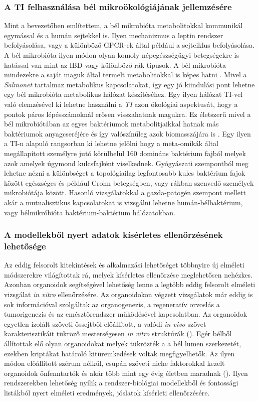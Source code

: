 \documentclass[a4paper,12pt]{article}
\begin{document}
		\subsubsection{A TI felhasználása bél mikroökológiájának jellemzésére}
		Mint a bevezetőben említettem, a bél mikrobióta metabolitokkal kommunikál egymással és a humán sejtekkel is. Ilyen mechanizmus a leptin rendszer befolyásolása, vagy a különböző GPCR-ek által például a sejtciklus befolyásolása\cite{buthyrate_immune}.  A bél mikrobióta ilyen módon olyan komoly népegészségügyi betegségekre is hatással van mint az IBD vagy különböző rák típusok\cite{gut_microbiome}.  A bél mikrobióta mindezekre a saját maguk által termelt metabolitokkal is képes hatni \cite{scfa_and_vitamine}. Mivel a \textit{Salmonet} tartalmaz metabolikus kapcsolatokat, így egy jó kiindulási pont lehetne egy bél mikrobióta metabolikus hálózat készítéséhez. Egy ilyen hálózat TI-vel való elemzésével ki lehetne használni a \textit{TI} azon ökológiai aspektusát, hogy a pontok páros lépésszámoknál erősen visszahatnak magukra. Ez életszerű mivel a bél mikrobiótában az egyes baktériumok metabolitjaikkal hatnak más baktériumok anyagcseréjére és így valószínűleg azok biomasszájára is \cite{gut_microbiome}.  Egy ilyen a TI-n alapuló rangsorban ki lehetne jelölni hogy a meta-omikák által megállapított személyre jutó körülbelül 160 domináns baktérium fajból \cite{meta_omics} melyek azok amelyek úgymond kulcsfajként viselkednek. Gyógyászati szempontból meg lehetne nézni a különbséget a topológiailag legfontosabb kulcs baktérium fajok között egészséges és például Crohn betegségben, vagy rákban szenvedő személyek mikrobiótája között. Hasonló vizsgálatokkal a gazda-patogén szempont mellett akár a mutualisztikus kapcsolatokat is vizsgálni lehetne humán-bélbaktérium, vagy bélmikróbióta baktérium-baktérium hálózatokban.
		

		\subsubsection{A modellekből nyert adatok kísérletes ellenőrzésének lehetősége}
		Az eddig felsorolt kitekintések és alkalmazási lehetőséget többnyire új elméleti módszerekre világítottak rá, melyek kísérletes ellenőrzése meglehetősen nehézkes. Azonban organoidok segítségével lehetőség lenne a legtöbb eddig felsorolt elméleti vizsgálat \textit{in vitro} ellenőrzésére. Az organoidokon végzett vizsgálatok már eddig is sok információval szolgáltak az organogenezis, a regeneratív orvoslás a tumorigenezis és az emésztőrendszer működésével kapcsolatban. Az organoidok egyetlen izolált szöveti őssejtből előállított, a valódi \textit{in vivo} szövet karakterisztikáit tükröző mesterségesen \textit{in vitro} struktúrák (\cite{organoid}).
		Egér bélből állítottak elő olyan organoidokat melyek tükrözték a a bél lumen szerkezetét, ezekben kriptákat határoló kitüremkedések voltak megfigyelhetők. Az ilyen módon előállított szérum nélkül, csupán szöveti niche faktorokkal kezelt organoidok önfenntartók és akár több mint egy évig életben maradnak (\cite{organoid}).  Ilyen rendszerekben lehetőség nyílik a rendszer-biológiai modellekből és fontossági listákból nyert elméleti eredmények, jóslatok kísérleti ellenőrzésére.
		
\end{document}
